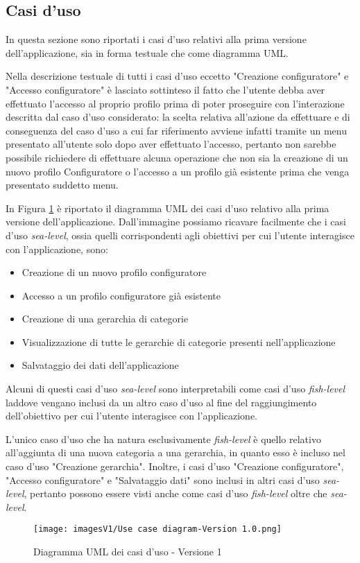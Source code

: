 \subsection{Casi d'uso}
In questa sezione sono riportati i casi d'uso relativi alla prima versione dell'applicazione, sia in forma testuale che come diagramma UML.\bigskip 

Nella descrizione testuale di tutti i casi d'uso eccetto "Creazione configuratore" e "Accesso configuratore" è lasciato sottinteso il fatto che l'utente debba aver effettuato l'accesso al proprio profilo prima di poter proseguire con l'interazione descritta dal caso d'uso considerato: la scelta relativa all'azione da effettuare e di conseguenza del caso d'uso a cui far riferimento avviene infatti tramite un menu presentato all'utente solo dopo aver effettuato l'accesso, pertanto non sarebbe possibile richiedere di effettuare alcuna operazione che non sia la creazione di un nuovo profilo Configuratore o l'accesso a un profilo già esistente prima che venga presentato suddetto menu.\bigskip



In Figura \ref{fig:Use Case 1} è riportato il diagramma UML dei casi d'uso relativo alla prima versione dell'applicazione. Dall'immagine possiamo ricavare facilmente che i casi d'uso \textit{sea-level}, ossia quelli corrispondenti agli obiettivi per cui l'utente interagisce con l'applicazione, sono:
\begin{itemize}
    \item Creazione di un nuovo profilo configuratore 
    \item Accesso a un profilo configuratore già esistente
    \item Creazione di una gerarchia di categorie
    \item Visualizzazione di tutte le gerarchie di categorie presenti nell'applicazione
    \item Salvataggio dei dati dell'applicazione
\end{itemize}
Alcuni di questi casi d'uso \textit{sea-level} sono interpretabili come casi d'uso \textit{fish-level} laddove vengano inclusi da un altro caso d'uso al fine del raggiungimento dell'obiettivo per cui l'utente interagisce con l'applicazione.

L'unico caso d'uso che ha natura esclusivamente \textit{fish-level} è quello relativo all'aggiunta di una nuova categoria a una gerarchia, in quanto esso è incluso nel caso d'uso "Creazione gerarchia". Inoltre, i casi d'uso "Creazione configuratore", "Accesso configuratore" e "Salvataggio dati" sono inclusi in altri casi d'uso \textit{sea-level}, pertanto possono essere visti anche come casi d'uso \textit{fish-level} oltre che \textit{sea-level}.

\begin{figure}[hb]
\centering
\texttt{[image: imagesV1/Use case diagram-Version 1.0.png]}
\caption{\label{fig:Use Case 1}Diagramma UML dei casi d'uso - Versione 1}
\end{figure}\bigskip